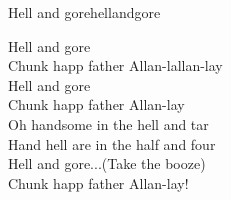 \begin{song}{Hell and gore}{hellandgore}
\begin{vers}
Hell and gore\\
Chunk happ father Allan-lallan-lay\\
Hell and gore\\
Chunk happ father Allan-lay\\
Oh handsome in the hell and tar\\
Hand hell are in the half and four\\
Hell and gore...(Take the booze)\\
Chunk happ father Allan-lay!\\
\end{vers}
\end{song}
